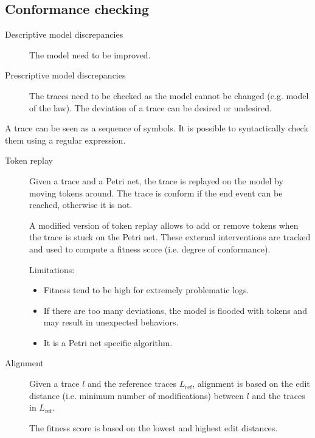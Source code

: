 \subsection{Conformance checking}

\begin{description}
    \item[Descriptive model discrepancies] 
        The model need to be improved.

    \item[Prescriptive model discrepancies] 
        The traces need to be checked as the model cannot be changed (e.g. model of the law).
        The deviation of a trace can be desired or undesired.
\end{description}

\begin{remark}
    A trace can be seen as a sequence of symbols. It is possible to syntactically check them using a regular expression.
\end{remark}

\begin{description}
    \item[Token replay] 
        Given a trace and a Petri net, the trace is replayed on the model by moving tokens around.
        The trace is conform if the end event can be reached, otherwise it is not.

        A modified version of token replay allows to add or remove tokens when the trace is stuck on the Petri net. 
        These external interventions are tracked and used to compute a fitness score (i.e. degree of conformance).

        Limitations:
        \begin{itemize}
            \item Fitness tend to be high for extremely problematic logs.
            \item If there are too many deviations, the model is flooded with tokens and may result in unexpected behaviors.
            \item It is a Petri net specific algorithm.
        \end{itemize}

    \item[Alignment] 
        Given a trace $l$ and the reference traces $L_\text{ref}$, 
        alignment is based on the edit distance (i.e. minimum number of modifications) between $l$ and the traces in $L_\text{ref}$.

        The fitness score is based on the lowest and highest edit distances.
\end{description}